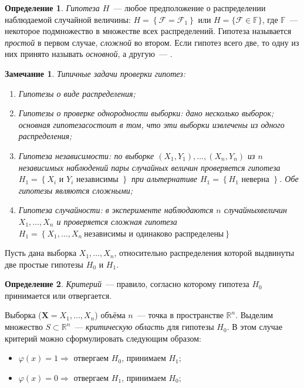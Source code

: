 \documentclass[oneside,final,14pt]{extreport}
\newtheorem*{rmrk}{Замечание}
\theoremstyle{definition}
\newtheorem{defn}{Определение}[section]
\begin{document}
\begin{defn}
{\it Гипотеза $H$}~--- любое предположение о распределении наблюдаемой случайной величины: $H=\left\{\mathcal{F}=\mathcal{F}_{1}\right\}$ или $H=\{\mathcal{F} \in \mathbb{F}\}$, где $\mathbb{F}$~--- некоторое подмножество в множестве всех распределений. Гипотеза называется {\it простой} в первом случае, {\it сложной} во втором. Если гипотез всего две, то одну из них принято называть {\it основной}, а другую~--- {}.
\end{defn}

\begin{rmrk} Типичные задачи проверки гипотез:
\begin{enumerate}
    \item Гипотезы о виде распределения;
    \item Гипотезы о проверке однородности выборки: дано несколько выборок; основная гипотезасостоит в том, что эти выборки извлечены из одного распределения;
    \item Гипотеза независимости: по выборке $(X_1,Y_1), \ldots, (X_n,Y_n)$ из $n$ независимых наблюдений пары случайных величин проверяется гипотеза $H_{1}=\left\{X_{i} \text { и } Y_{i} \text { независимы }\right\}$ при альтернативе $H_{1}=\left\{H_{1} \text { неверна }\right\}$. Обе гипотезы являются сложными;
    \item Гипотеза случайности: в эксперименте наблюдаются $n$ случайныхвеличин $X_{1}, \ldots, X_{n}$ и проверяется сложная гипотеза $H_{1}=\left\{X_{1}, \ldots, X_{n}~ \text{независимы и одинаково распределены}\right\}$
\end{enumerate}
\end{rmrk}

Пусть дана выборка $X_{1}, \ldots, X_{n}$, относительно распределения которой выдвинуты две простые гипотезы $H_{0}$ и $H_1$.
\begin{defn}
{\it Критерий}~--- правило, согласно которому гипотеза $H_0$ принимается или отвергается.
\end{defn}
Выборка ($\mathbf{X} = X_1, \ldots, X_n$) объёма $n$~--- точка в пространстве $\mathbb{R}^{n}$. Выделим множество $S \subset \mathbb{R}^{n}$~--- {\it критическую область} для гипотезы $H_0$. В этом случае критерий можно сформулировать следующим образом:
\begin{itemize}
    \item $\varphi(x) = 1 \Rightarrow$ отвергаем $H_0$, принимаем $H_1$;
    \item $\varphi(x) = 0 \Rightarrow$ отвергаем $H_1$, принимаем $H_0$;
\end{itemize}
\end{document}
